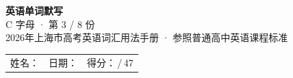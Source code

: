 \documentclass[10pt,a4paper]{article}
\begin{document}
\pagestyle{plain}

\begin{center}
{\LARGE\bfseries 英语单词默写}\\[0.22em]
{\large C 字母 · 第 3 / 8 份}\\[0.18em]
{\small 2026年上海市高考英语词汇用法手册 · 参照普通高中英语课程标准}
\end{center}

\vspace{0.25em}
\noindent\begin{tabular}{@{}p{}@{}p{}@{}p{}@{}}
姓名：\underline{\hspace{2.0cm}} & 日期：\underline{\hspace{2.0cm}} & 得分：\underline{\hspace{1.3cm}}\,/\,47 \\
\end{tabular}

\vspace{0.3em}

\vspace{0.08em}
\end{document}
